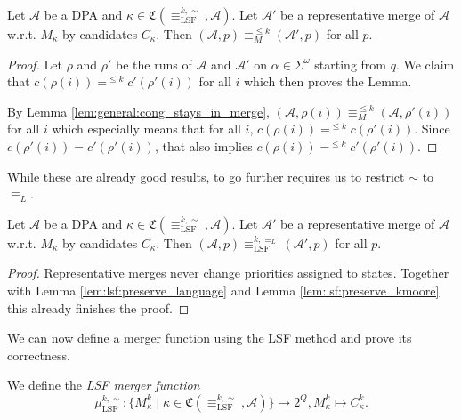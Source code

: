 \begin{lem}
	Let $\mathcal{A}$ be a DPA and $\kappa \in \mathfrak{C}(\equiv_\text{LSF}^{k,\sim}, \mathcal{A})$. Let $\mathcal{A}'$ be a representative merge of $\mathcal{A}$ w.r.t. $M_\kappa$ by candidates $C_\kappa$. Then $(\mathcal{A}, p) \equiv_M^{\leq k} (\mathcal{A}', p)$ for all $p$.
	\label{lem:lsf:preserve_kmoore}
\end{lem}

\begin{proof}
	Let $\rho$ and $\rho'$ be the runs of $\mathcal{A}$ and $\mathcal{A}'$ on $\alpha \in \Sigma^\omega$ starting from $q$. We claim that $c(\rho(i)) =^{\leq k} c'(\rho'(i))$ for all $i$ which then proves the Lemma.
	
	By Lemma \ref{lem:general:cong_stays_in_merge}, $(\mathcal{A}, \rho(i)) \equiv_M^{\leq k} (\mathcal{A}, \rho'(i))$ for all $i$ which especially means that for all $i$, $c(\rho(i)) =^{\leq k} c(\rho'(i))$. Since $c(\rho'(i)) = c'(\rho'(i))$, that also implies $c(\rho(i)) =^{\leq k} c'(\rho'(i))$.
\end{proof}

\vspace{10pt}

While these are already good results, to go further requires us to restrict $\sim$ to $\equiv_L$.

\begin{lem} 
	Let $\mathcal{A}$ be a DPA and $\kappa \in \mathfrak{C}(\equiv_\text{LSF}^{k,\sim}, \mathcal{A})$. Let $\mathcal{A}'$ be a representative merge of $\mathcal{A}$ w.r.t. $M_\kappa$ by candidates $C_\kappa$. Then $(\mathcal{A}, p) \equiv_\text{LSF}^{k,\equiv_L} (\mathcal{A}', p)$ for all $p$.
	\label{lem:lsf:preserve_lsf}
\end{lem}

\begin{proof}
	Representative merges never change priorities assigned to states. Together with Lemma \ref{lem:lsf:preserve_language} and Lemma \ref{lem:lsf:preserve_kmoore} this already finishes the proof.
\end{proof}


\vspace{10pt}

We can now define a merger function using the LSF method and prove its correctness.

\begin{defn}
	We define the \emph{LSF merger function} $$\mu_\text{LSF}^{k,\sim} : \{ M^k_\kappa \mid \kappa \in \mathfrak{C}(\equiv_\text{LSF}^{k,\sim}, \mathcal{A}) \} \rightarrow 2^Q , M^k_\kappa \mapsto C^k_\kappa .$$
\end{defn}

